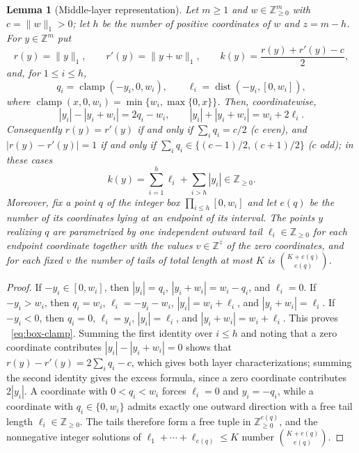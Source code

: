 \documentclass[pdflatex,sn-mathphys-num]{sn-jnl}
\theoremstyle{thmstyleone}
\newtheorem{lemma}[theorem]{Lemma}
\theoremstyle{thmstylethree}
\theoremstyle{thmstyletwo}
\newcommand{\Z}{\mathbb Z}
\begin{document}
\begin{lemma}[Middle-layer representation]
\label{lem:middle-layer}
Let $m\ge1$ and $w\in\Z_{\ge0}^m$ with $c=\|w\|_1>0$; let $h$ be the number
of positive coordinates of $w$ and $z=m-h$.  For $y\in\Z^m$ put
\[
 r(y)=\|y\|_1,\qquad r'(y)=\|y+w\|_1,\qquad
 k(y)=\frac{r(y)+r'(y)-c}{2},
\]
and, for $1\le i\le h$,
\[
 q_i=\operatorname{clamp}(-y_i,0,w_i),\qquad
 \ell_i=\operatorname{dist}(-y_i,[0,w_i]),
\]
where $\operatorname{clamp}(x,0,w_i)=\min\{w_i,\max\{0,x\}\}$.  Then,
coordinatewise,
\begin{equation}
 |y_i|-|y_i+w_i|=2q_i-w_i,\qquad
 |y_i|+|y_i+w_i|=w_i+2\ell_i.             \label{eq:box-clamp}
\end{equation}
Consequently $r(y)=r'(y)$ if and only if $\sum_iq_i=c/2$ ($c$ even), and
$|r(y)-r'(y)|=1$ if and only if $\sum_iq_i\in\{(c-1)/2,(c+1)/2\}$ ($c$ odd);
in these cases
\[
 k(y)=\sum_{i=1}^h\ell_i+\sum_{i>h}|y_i|\in\Z_{\ge0}.
\]
Moreover, fix a point $q$ of the integer box $\prod_{i\le h}[0,w_i]$ and let
$e(q)$ be the number of its coordinates lying at an endpoint of its
interval.  The points $y$ realizing $q$ are parametrized by one independent
outward tail $\ell_i\in\Z_{\ge0}$ for each endpoint coordinate together with
the values $v\in\Z^z$ of the zero coordinates, and for each fixed $v$ the
number of tails of total length at most $K$ is $\binom{K+e(q)}{e(q)}$.
\end{lemma}

\begin{proof}
If $-y_i\in[0,w_i]$, then $|y_i|=q_i$, $|y_i+w_i|=w_i-q_i$, and
$\ell_i=0$.  If $-y_i>w_i$, then $q_i=w_i$, $\ell_i=-y_i-w_i$,
$|y_i|=w_i+\ell_i$, and $|y_i+w_i|=\ell_i$.  If $-y_i<0$, then $q_i=0$,
$\ell_i=y_i$, $|y_i|=\ell_i$, and $|y_i+w_i|=w_i+\ell_i$.  This proves
~\eqref{eq:box-clamp}.  Summing the first identity over $i\le h$ and noting
that a zero coordinate contributes $|y_i|-|y_i+w_i|=0$ shows that
$r(y)-r'(y)=2\sum_iq_i-c$, which gives both layer characterizations;
summing the second identity gives the excess formula, since a zero
coordinate contributes $2|y_i|$.  A coordinate with $0<q_i<w_i$ forces
$\ell_i=0$ and $y_i=-q_i$, while a coordinate with $q_i\in\{0,w_i\}$ admits
exactly one outward direction with a free tail length $\ell_i\in\Z_{\ge0}$.
The tails therefore form a free tuple in $\Z_{\ge0}^{e(q)}$, and the
nonnegative integer solutions of $\ell_1+\cdots+\ell_{e(q)}\le K$ number
$\binom{K+e(q)}{e(q)}$.
\end{proof}
\end{document}
